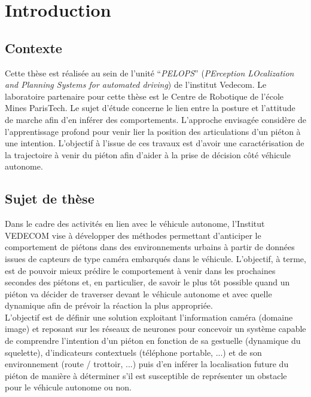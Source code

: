 \clearpage
\chapter{Introduction}
\label{sec:Intro}

\section{Contexte}
Cette thèse est réalisée au sein de l’unité “\textit{PELOPS}” (\textit{PErception LOcalization and Planning Systems for automated driving}) de l'institut Vedecom. Le laboratoire partenaire pour cette thèse est le Centre de Robotique de l'école Mines ParisTech. Le sujet d’étude concerne le lien entre la posture et l’attitude de marche afin d’en inférer des comportements. L’approche envisagée considère de l’apprentissage profond pour venir lier la position des articulations d’un piéton à une intention. L’objectif à l’issue de ces travaux est d’avoir une caractérisation de la trajectoire à venir du piéton afin d’aider à la prise de décision côté véhicule autonome.

\section{Sujet de thèse}
Dans le cadre des activités en lien avec le véhicule autonome, l’Institut VEDECOM vise à développer des méthodes permettant d’anticiper le comportement de piétons dans des environnements urbains à partir de données issues de capteurs de type caméra embarqués dans le véhicule. L’objectif, à terme, est de pouvoir mieux prédire le comportement à venir dans les prochaines secondes des piétons et, en particulier, de savoir le plus tôt possible quand un piéton va décider de traverser devant le véhicule autonome et avec quelle dynamique afin de prévoir la réaction la plus appropriée.\\

L'objectif est de définir une solution exploitant l’information caméra (domaine image) et reposant sur les réseaux de neurones pour concevoir un système capable de comprendre l’intention d’un piéton en fonction de sa gestuelle (dynamique du squelette), d'indicateurs contextuels (téléphone portable, ...) et de son environnement (route / trottoir, ...) puis d’en inférer la localisation future du piéton de manière à déterminer s’il est susceptible de représenter un obstacle pour le véhicule autonome ou non.


